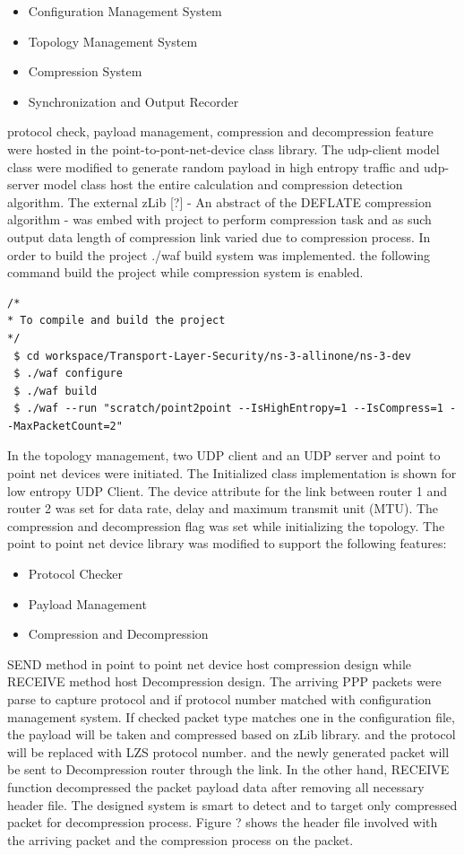 \documentclass[sigconf]{acmart}
\begin{document}
\begin{itemize}
\item Configuration Management System
\item Topology Management System
\item Compression System
\item Synchronization and Output Recorder
\end{itemize}

protocol check, payload management, compression and decompression feature were hosted in the point-to-pont-net-device class library. The udp-client model class were modified to generate random payload in high entropy traffic and udp-server model class host the entire calculation and compression detection algorithm. The external zLib [?] - An abstract of the DEFLATE compression algorithm - was embed with project to perform compression task and as such output data length of compression link varied due to compression process.  
In order to build the project ./waf build system was implemented. the following command build the project while compression system is enabled. 
 
 \begin{lstlisting}
/*
* To compile and build the project
*/
 $ cd workspace/Transport-Layer-Security/ns-3-allinone/ns-3-dev    
 $ ./waf configure
 $ ./waf build
 $ ./waf --run "scratch/point2point --IsHighEntropy=1 --IsCompress=1 --MaxPacketCount=2"

\end{lstlisting}

 
In the topology management, two UDP client and an UDP server and point to point net devices were initiated. The Initialized class implementation is shown for low entropy UDP Client. The device attribute for the link between router 1 and router 2 was set for data rate, delay and maximum transmit unit (MTU). The compression and decompression flag was set while initializing the topology. The point to point net device library was modified to support the following features: 
 
 
\begin{itemize}
\item Protocol Checker
\item Payload Management
\item Compression and Decompression
\end{itemize}
 
 SEND method in point to point net device host compression design while RECEIVE method host Decompression design. The arriving PPP packets were parse to capture protocol and if protocol number matched with configuration management system. If checked packet type matches one in the configuration file, the payload will be taken and compressed based on zLib library. and the protocol will be replaced with LZS protocol number. and the newly generated packet will be sent to Decompression router through the link.  
In the other hand, RECEIVE function decompressed the packet payload data after removing all necessary header file.  The designed system is smart to detect and to target only compressed packet for decompression process. Figure ? shows the header file involved with the arriving packet and the compression process on the packet. 
 
\end{document}
